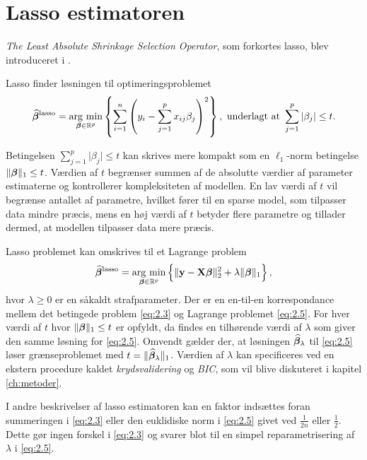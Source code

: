 \section{Lasso estimatoren} \label{sec:lasso_estimatoren}
\textit{The Least Absolute Shrinkage Selection Operator}, som forkortes lasso, blev introduceret i \citep{lasso}. 
\begin{defn}[Lasso]
Lasso finder løsningen til optimeringsproblemet
\begin{align}
\widehat{\tbeta}^\text{lasso} = \argmin_{\tbeta \in \R^p} \cbr{\sum_{i=1}^n \del{y_i - \sum_{j=1}^p x_{ij} \beta_j}^2}, \ \text{underlagt at } \sum_{j=1}^p \vert \beta_j \vert \leq t. \label{eq:2.3}
\end{align} 
\end{defn}
Betingelsen $\sum_{j=1}^p \vert \beta_j \vert \leq t$ kan skrives mere kompakt som en \(\ell_1\)-norm betingelse $\Vert \boldsymbol{\beta} \Vert_1 \leq t$.
Værdien af \(t\) begrænser summen af de absolutte værdier af parameter estimaterne og kontrollerer kompleksiteten af modellen. 
En lav værdi af \(t\) vil begrænse antallet af parametre, hvilket fører til en sparse model, som tilpasser data mindre præcis, mens en høj værdi af \(t\) betyder flere parametre og tillader dermed, at modellen tilpasser data mere præcis.

Lasso problemet kan omskrives til et Lagrange problem
\begin{align}
\widehat{\tbeta}^\text{lasso} = \argmin_{\tbeta \in \R^p} \cbr{ \Vert \y - \X \tbeta \Vert_2^2 + \lambda \Vert \tbeta \Vert_1}, \label{eq:2.5}
\end{align}
hvor $\lambda \geq 0$ er en såkaldt strafparameter. 
Der er en en-til-en korrespondance mellem det betingede problem \eqref{eq:2.3} og Lagrange problemet \eqref{eq:2.5}. 
For hver værdi af \(t\) hvor \(\Vert \boldsymbol{\beta} \Vert_1 \leq t\) er opfyldt, da findes en tilhørende værdi af $\lambda$ som giver den samme løsning for \eqref{eq:2.5}.
Omvendt gælder der, at løsningen $\widehat{\boldsymbol{\beta}}_\lambda$ til \eqref{eq:2.5} løser grænseproblemet med $t=\Vert \widehat{\boldsymbol{\beta}}_\lambda \Vert_1$.
Værdien af \(\lambda\) kan specificeres ved en ekstern procedure kaldet \textit{krydsvalidering} og \textit{BIC}, som vil blive diskuteret i kapitel \ref{ch:metoder}.

I andre beskrivelser af lasso estimatoren kan en faktor indsættes foran summeringen i \eqref{eq:2.3} eller den euklidiske norm i \eqref{eq:2.5} givet ved \(\frac{1}{2n}\) eller \(\frac{1}{2}\).
Dette gør ingen forskel i \eqref{eq:2.3} og svarer blot til en simpel reparametrisering af \(\lambda\) i \eqref{eq:2.5}.

